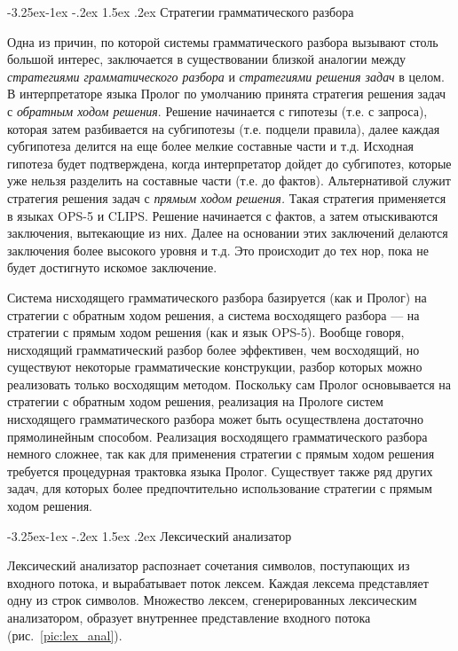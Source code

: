 \documentclass[12pt, openany, twoside]{book} %
\makeatletter
\renewcommand\subsection{\@startsection{subsection}{2}{\z@}%
                                     {-3.25ex\@plus -1ex \@minus -.2ex}%
                                     {1.5ex \@plus .2ex}%
                                     {\normalfont\normalsize\bfseries}}
\makeatother
\begin{document}
\subsection{Стратегии грамматического разбора}

Одна из причин, по которой системы грамматического разбора вызывают столь большой интерес, заключается в существовании близкой аналогии между \emph{стратегиями грамматического разбора} и \emph{стратегиями решения задач} в целом. В интерпретаторе языка Пролог по умолчанию принята стратегия решения задач с \emph{обратным ходом решения}. Решение начинается с гипотезы (т.е. с запроса), которая затем разбивается на субгипотезы (т.е. подцели правила), далее каждая субгипотеза делится на еще более мелкие составные части и т.д. Исходная гипотеза будет подтверждена, когда интерпретатор дойдет до субгипотез, которые уже нельзя разделить на составные части (т.е. до фактов). Альтернативой служит стратегия решения задач с \emph{прямым ходом решения.} Такая стратегия применяется в языках OPS-5 и CLIPS. Решение начинается с фактов, а затем отыскиваются заключения, вытекающие из них. Далее на основании этих заключений делаются заключения более высокого уровня и т.д. Это происходит до тех нор, пока не будет достигнуто искомое заключение.

Система нисходящего грамматического разбора базируется (как и Пролог) на стратегии с обратным ходом решения, а система восходящего разбора --- на стратегии с прямым ходом решения (как и язык OPS-5). Вообще говоря, нисходящий грамматический разбор более эффективен, чем восходящий, но существуют некоторые грамматические конструкции, разбор которых можно реализовать только восходящим методом. Поскольку сам Пролог основывается на стратегии с обратным ходом решения, реализация на Прологе систем нисходящего грамматического разбора может быть осуществлена достаточно прямолинейным способом. Реализация восходящего грамматического разбора немного сложнее, так как для применения стратегии с прямым ходом решения требуется процедурная трактовка языка Пролог. Существует также ряд других задач, для которых более предпочтительно использование стратегии с прямым ходом решения.

\subsection{Лексический анализатор}

Лексический анализатор распознает сочетания символов, поступающих из входного потока, и вырабатывает поток лексем. Каждая лексема представляет одну из строк символов. Множество лексем, сгенерированных лексическим анализатором, образует внутреннее представление входного потока (рис.~\ref{pic:lex_anal}).
\end{document}
